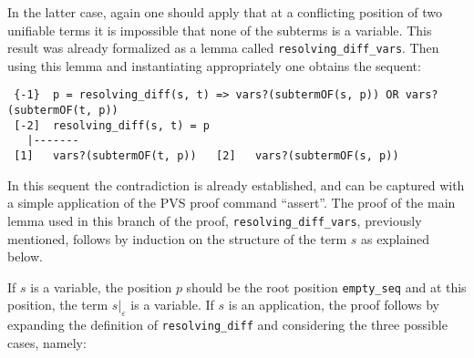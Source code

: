 \documentclass[submission,copyright,creativecommons]{eptcs}
\begin{document}
In the latter case, again one should apply that at a conflicting
position of two unifiable terms it is impossible that none of the
subterms is a variable. This result was already formalized as a lemma
called {\tt resolving\_diff\_vars}. Then using this lemma and
instantiating appropriately one obtains the sequent:

{\small
\begin{verbatim}
 {-1}  p = resolving_diff(s, t) => vars?(subtermOF(s, p)) OR vars?(subtermOF(t, p))
 [-2]  resolving_diff(s, t) = p
   |-------
 [1]   vars?(subtermOF(t, p))   [2]   vars?(subtermOF(s, p))
\end{verbatim}
}

In this sequent the contradiction is already established, and can be
captured with a simple application of the PVS proof command
``assert''. The proof of the main lemma used in this branch of the
proof, {\tt resolving\_diff\_vars}, previously mentioned, follows by
induction on the structure of the term $s$ as explained below.

If $s$ is a variable, the position $p$ should be the root position
{\tt empty\_seq} and at this position, the term $s|_\varepsilon$ is a
variable.  If $s$ is an application, the proof follows by expanding
the definition of {\tt resolving\_diff} and considering the three
possible cases, namely:
\end{document}
